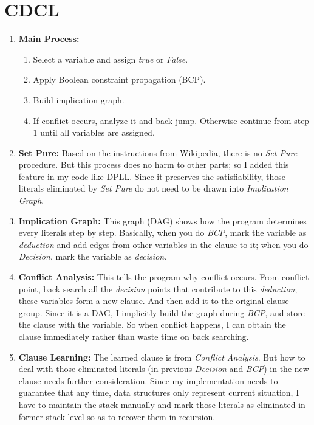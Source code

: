 \documentclass[a4paper,10pt]{article}
\begin{document}
\section{CDCL}
\begin{enumerate}
\setlength{\itemsep}{.1em}
\item \textbf{Main Process:} 
\vspace{-7pt}
\begin{center}
\begin{enumerate}
\small\setlength{\itemsep}{.1em}
\item Select a variable and assign \textit{true} or \textit{False}. 
\item Apply Boolean constraint propagation (BCP).
\item Build implication graph.
\item If conflict occurs, analyze it and back jump.
Otherwise continue from step $1$ until all variables are assigned.
\end{enumerate}
\end{center}
\vspace{-5pt}
\item \textbf{Set Pure:} Based on the instructions from Wikipedia, there is no \textit{Set Pure} procedure. But this process does no harm to other parts; so I added this feature in my code like DPLL. Since it preserves the satisfiability, those literals eliminated by \textit{Set Pure} do not need to be drawn into \textit{Implication Graph}.
\item \textbf{Implication Graph:} This graph (DAG) shows how the program determines every literals step by step. Basically, when you do \textit{BCP}, mark the variable as \textit{deduction} and add edges from other variables in the clause to it; when you do \textit{Decision}, mark the variable as \textit{decision}.
\item \textbf{Conflict Analysis:} This tells the program why conflict occurs. From conflict point, back search all the \textit{decision} points that contribute to this \textit{deduction}; these variables form a new clause. And then add it to the original clause group.
Since it is a DAG, I implicitly build the graph during \textit{BCP}, and store the clause with the variable. So when conflict happens, I can obtain the clause immediately rather than waste time on back searching.
\item \textbf{Clause Learning:} The learned clause is from \textit{Conflict Analysis}.
    But how to deal with those eliminated literals (in previous \textit{Decision} and \textit{BCP}) in the new clause needs further consideration. Since my implementation needs to guarantee that any time, data structures only represent current situation, I have to maintain the stack manually and mark those literals as eliminated in former stack level so as to recover them in recursion.

\end{enumerate}
\end{document}
